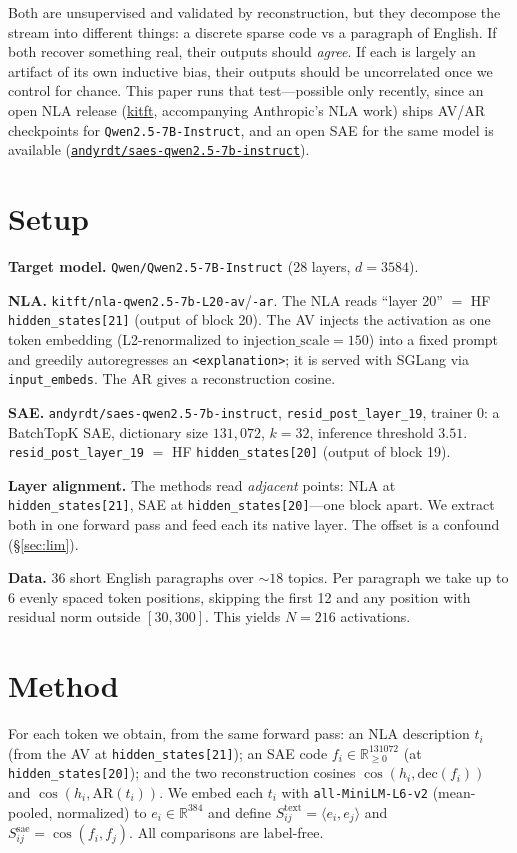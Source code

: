 \documentclass[11pt]{article}
\begin{document}
Both are unsupervised and validated by reconstruction, but they decompose the
stream into different things: a discrete sparse code vs a paragraph of English.
If both recover something real, their outputs should \emph{agree}. If each is
largely an artifact of its own inductive bias, their outputs should be
uncorrelated once we control for chance. This paper runs that test---possible
only recently, since an open NLA release
(\href{https://github.com/kitft/natural_language_autoencoders}{kitft},
accompanying Anthropic's NLA work) ships AV/AR checkpoints for
\texttt{Qwen2.5-7B-Instruct}, and an open SAE for the same model is available
(\href{https://huggingface.co/andyrdt/saes-qwen2.5-7b-instruct}{\texttt{andyrdt/saes-qwen2.5-7b-instruct}}).

\section{Setup}
\textbf{Target model.} \texttt{Qwen/Qwen2.5-7B-Instruct} (28 layers, $d=3584$).

\textbf{NLA.} \texttt{kitft/nla-qwen2.5-7b-L20-av}/\texttt{-ar}. The NLA reads
``layer 20'' $=$ HF \texttt{hidden\_states[21]} (output of block 20). The AV
injects the activation as one token embedding (L2-renormalized to
$\text{injection\_scale}=150$) into a fixed prompt and greedily autoregresses an
\texttt{<explanation>}; it is served with SGLang via \texttt{input\_embeds}. The
AR gives a reconstruction cosine.

\textbf{SAE.} \texttt{andyrdt/saes-qwen2.5-7b-instruct},
\texttt{resid\_post\_layer\_19}, trainer 0: a BatchTopK SAE, dictionary size
$131{,}072$, $k=32$, inference threshold $3.51$.
\texttt{resid\_post\_layer\_19} $=$ HF \texttt{hidden\_states[20]} (output of
block 19).

\textbf{Layer alignment.} The methods read \emph{adjacent} points: NLA at
\texttt{hidden\_states[21]}, SAE at \texttt{hidden\_states[20]}---one block
apart. We extract both in one forward pass and feed each its native layer. The
offset is a confound (\S\ref{sec:lim}).

\textbf{Data.} 36 short English paragraphs over ${\sim}18$ topics. Per paragraph
we take up to 6 evenly spaced token positions, skipping the first 12 and any
position with residual norm outside $[30,300]$. This yields $N=216$ activations.

\section{Method}
For each token we obtain, from the same forward pass: an NLA description $t_i$
(from the AV at \texttt{hidden\_states[21]}); an SAE code
$f_i \in \mathbb{R}_{\ge 0}^{131072}$ (at \texttt{hidden\_states[20]}); and the
two reconstruction cosines $\cos(h_i, \mathrm{dec}(f_i))$ and
$\cos(h_i, \mathrm{AR}(t_i))$. We embed each $t_i$ with
\texttt{all-MiniLM-L6-v2} (mean-pooled, normalized) to $e_i \in \mathbb{R}^{384}$
and define $S^{\text{text}}_{ij}=\langle e_i,e_j\rangle$ and
$S^{\text{sae}}_{ij}=\cos(f_i,f_j)$. All comparisons are label-free.
\end{document}
